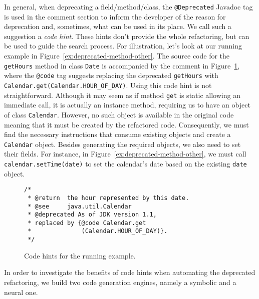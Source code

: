 \documentclass[sigconf,review,anonymous]{acmart}
\begin{document}
In general, when deprecating a field/method/class, the \texttt{@Deprecated} Javadoc tag is used in the
comment section to inform the developer of the reason for deprecation and, sometimes, what can be used in its place. We call such a suggestion a {\em code hint}.
These hints don't provide the whole refactoring, but can be used to guide the search process.
%
For illustration, let's look at our running example in Figure~\ref{ex:deprecated-method-other}. The source code for the \texttt{getHours} method in class \texttt{Date} is accompanied by the comment in Figure~\ref{ex:code-hints}, where the \texttt{@code} tag suggests replacing the deprecated \texttt{getHours}
with \texttt{Calendar.get(Calendar.HOUR\_OF\_DAY)}.
Using this code hint is not straightforward.
Although it may seem as if
method \texttt{get} is static allowing an immediate call,
it is actually an instance method, requiring us to have an object of
class \texttt{Calendar}. However, no such object is available in the
original code meaning that it must be created by the refactored code.
Consequently, we must find the necessary
instructions that consume existing objects and create a \texttt{Calendar} object.
Besides generating the required objects, we also need to set their
fields. For instance,
in Figure~\ref{ex:deprecated-method-other}, we must call
\texttt{calendar.setTime(date)} to set the calendar's date
based on the existing \texttt{date} object.


\begin{figure}
\begin{lstlisting}[mathescape=true,showstringspaces=false]
/*
 * @return  the hour represented by this date.
 * @see     java.util.Calendar
 * @deprecated As of JDK version 1.1,
 * replaced by {@code Calendar.get
 *              (Calendar.HOUR_OF_DAY)}.
 */  
\end{lstlisting}
\caption{Code hints for the running example.}
\label{ex:code-hints}
\end{figure}





In order to investigate the benefits of code hints when automating the deprecated refactoring,
we build two code generation engines, namely a symbolic and a neural one.
\end{document}
